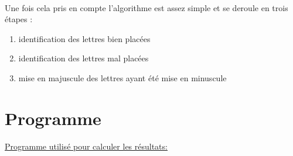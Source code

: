 \paragraph{}
Une fois cela pris en compte l'algorithme est assez simple et se deroule en trois étapes :
\begin{enumerate}
\item identification des lettres bien placées 
\item identification des lettres mal placées
\item mise en majuscule des lettres ayant été mise en minuscule
\end{enumerate}
 
 
\newpage
\section{Programme}
\underline{Programme utilisé pour calculer les résultats:}

